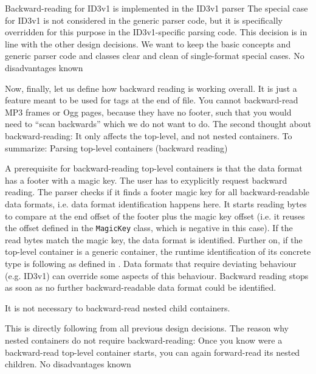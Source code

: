 {%
Backward-reading for ID3v1 is implemented in the ID3v1 parser
}
{%
The special case for ID3v1 is not considered in the generic parser code, but it is specifically overridden for this purpose in the ID3v1-specific parsing code.
}
{%
This decision is in line with the other design decisions. We want to keep the basic concepts and generic parser code and classes clear and clean of single-format special cases.
}
{%
No disadvantages known
}

Now, finally, let us define how backward reading is working overall. It is just a feature meant to be used for tags at the end of file. You cannot backward-read MP3 frames or Ogg pages, because they have no footer, such that you would need to ``scan backwards'' which we do not want to do. The second thought about backward-reading: It only affects the top-level, and not nested containers. To summarize:
{%
Parsing top-level containers (backward reading)
}
{%
A prerequisite for backward-reading top-level containers is that the data format has a footer with a magic key. The user has to exyplicitly request backward reading. The parser checks if it finds a footer magic key for all backward-readable data formats, i.e. data format identification happens here. It starts reading bytes to compare at the end offset of the footer plus the magic key offset (i.e. it reuses the offset defined in the \texttt{MagicKey} class, which is negative in this case). If the read bytes match the magic key, the data format is identified. Further on, if the top-level container is a generic container, the runtime identification of its concrete type is following as defined in . Data formats that require deviating behaviour (e.g. ID3v1) can override some aspects of this behaviour. Backward reading stops as soon as no further backward-readable data format could be identified.

It is not necessary to backward-read nested child containers. 
}
{%
This is directly following from all previous design decisions. The reason why nested containers do not require backward-reading: Once you know were a backward-read top-level container starts, you can again forward-read its nested children.
}
{%
No disadvantages known
}

